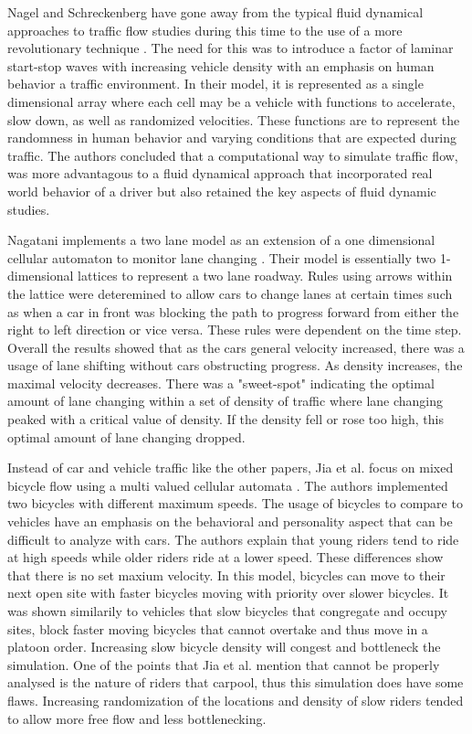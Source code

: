 \documentclass[sigplan,screen]{acmart}
\begin{document}
Nagel and Schreckenberg have gone away from the typical fluid dynamical
approaches to traffic flow studies during this time to the use of a more
revolutionary technique \cite{nagel_cellular_1992}. The need for this was to
introduce a factor of laminar start-stop waves with increasing vehicle density
with an emphasis on human behavior a traffic environment. In their model, it is
represented as a single dimensional array where each cell may be a vehicle with
functions to accelerate, slow down, as well as randomized velocities. These
functions are to represent the randomness in human behavior and varying
conditions that are expected during traffic. The authors concluded that a
computational way to simulate traffic flow, was more advantagous to a fluid
dynamical approach that incorporated real world behavior of a driver but also
retained the key aspects of fluid dynamic studies.

Nagatani implements a two lane model as an extension of a one dimensional
cellular automaton to monitor lane changing
\cite{nagatani_self-organization_1993}. Their model is essentially two
1-dimensional lattices to represent a two lane roadway. Rules using arrows
within the lattice were deteremined to allow cars to change lanes at certain
times such as when a car in front was blocking the path to progress forward from
either the right to left direction or vice versa. These rules were dependent on
the time step. Overall the results showed that as the cars general velocity
increased, there was a usage of lane shifting without cars obstructing progress.
As density increases, the maximal velocity decreases. There was a "sweet-spot"
indicating the optimal amount of lane changing within a set of density of
traffic where lane changing peaked with a critical value of density. If the
density fell or rose too high, this optimal amount of lane changing dropped.

Instead of car and vehicle traffic like the other papers, Jia et al. focus on
mixed bicycle flow using a multi valued cellular automata
\cite{jia_multi-value_2007}. The authors implemented two bicycles with different
maximum speeds. The usage of bicycles to compare to vehicles have an emphasis on
the behavioral and personality aspect that can be difficult to analyze with
cars. The authors explain that young riders tend to ride at high speeds while
older riders ride at a lower speed. These differences show that there is no set
maxium velocity. In this model, bicycles can move to their next open site with
faster bicycles moving with priority over slower bicycles. It was shown
similarily to vehicles that slow bicycles that congregate and occupy sites,
block faster moving bicycles that cannot overtake and thus move in a platoon
order. Increasing slow bicycle density will congest and bottleneck the
simulation. One of the points that Jia et al. mention that cannot be properly
analysed is the nature of riders that carpool, thus this simulation does have
some flaws. Increasing randomization of the locations and density of slow riders
tended to allow more free flow and less bottlenecking.
\end{document}
